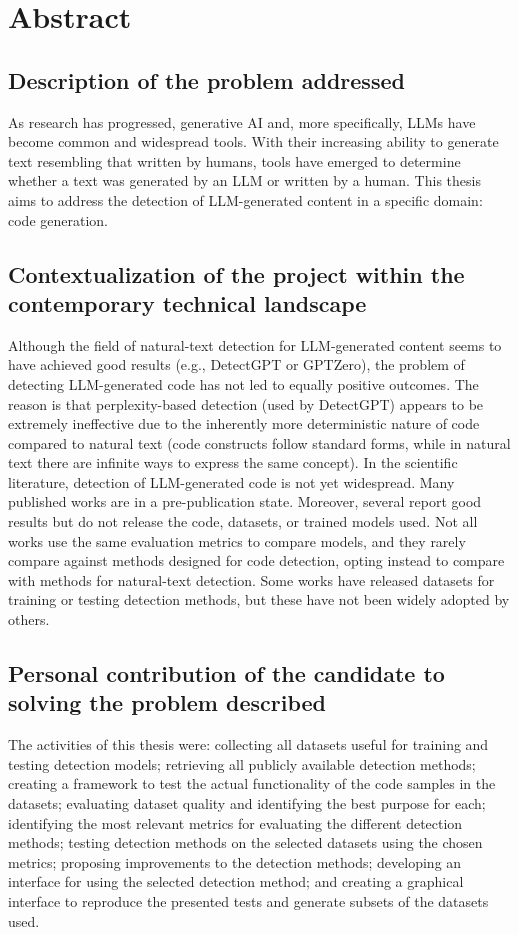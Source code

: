 \section*{Abstract}
\subsection*{Description of the problem addressed}
\noindent 
As research has progressed, generative AI and, more specifically, 
LLMs have become common and widespread tools. With their increasing ability 
to generate text resembling that written by humans, tools have emerged to 
determine whether a text was generated by an LLM or written by a human. 
This thesis aims to address the detection of LLM-generated content in a 
specific domain: code generation.


\subsection*{Contextualization of the project within the contemporary technical landscape}
\noindent 
Although the field of natural-text detection for LLM-generated content seems to have achieved good 
results (e.g., DetectGPT or GPTZero), the problem of detecting LLM-generated code has not 
led to equally positive outcomes. The reason is that perplexity-based detection 
(used by DetectGPT) appears to be extremely ineffective due to the inherently more 
deterministic nature of code compared to natural text (code constructs follow standard 
forms, while in natural text there are infinite ways to express the same concept).
In the scientific literature, detection of LLM-generated code is not yet widespread. 
Many published works are in a pre-publication state. Moreover, several report good results 
but do not release the code, datasets, or trained models used. Not all works use the same 
evaluation metrics to compare models, and they rarely compare against methods designed for 
code detection, opting instead to compare with methods for natural-text detection. 
Some works have released datasets for training or testing detection methods, but these 
have not been widely adopted by others.


\subsection*{Personal contribution of the candidate to solving the problem described}
\noindent 
The activities of this thesis were: collecting all datasets useful for training and 
testing detection models; retrieving all publicly available detection methods; creating a 
framework to test the actual functionality of the code samples in the datasets; evaluating 
dataset quality and identifying the best purpose for each; identifying the most relevant 
metrics for evaluating the different detection methods; testing detection methods on the 
selected datasets using the chosen metrics; proposing improvements to the detection methods; 
developing an interface for using the selected detection method; and creating a graphical 
interface to reproduce the presented tests and generate subsets of the datasets used.


